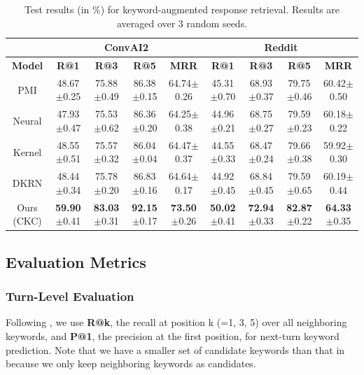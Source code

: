 \documentclass[letterpaper]{article} %
\begin{document}
\begin{table}[!t]
\small
\centering
\begin{tabular}{c|cccc|cccc}
\hline
&\multicolumn{4}{c|}{\textbf{ConvAI2}}&\multicolumn{4}{c}{\textbf{Reddit}}\\
\hline
\textbf{Model} & \textbf{R@1} & \textbf{R@3} & \textbf{R@5} & \textbf{MRR} & \textbf{R@1} & \textbf{R@3} & \textbf{R@5} & \textbf{MRR}\\
\hline
PMI & 48.67$\pm$0.25 & 75.88$\pm$0.49 & 86.38$\pm$0.15 & 64.74$\pm$0.26 & 45.31$\pm$0.70 & 68.93$\pm$0.37 & 79.75$\pm$0.46 & 60.42$\pm$0.50\\

Neural & 47.93$\pm$0.47 & 75.53$\pm$0.62 & 86.36$\pm$0.20 & 64.25$\pm$0.38 & 44.96$\pm$0.21 & 68.75$\pm$0.27 & 79.59$\pm$0.23 & 60.18$\pm$0.22\\

Kernel & 48.55$\pm$0.51 & 75.57$\pm$0.32 & 86.04$\pm$0.04 & 64.47$\pm$0.37 & 44.55$\pm$0.33 & 68.47$\pm$0.24 & 79.66$\pm$0.38 & 59.92$\pm$0.30\\

DKRN & 48.44$\pm$0.34 & 75.78$\pm$0.20 & 86.83$\pm$0.16 & 64.64$\pm$0.17 & 44.92$\pm$0.45 & 68.84$\pm$0.45 & 79.59$\pm$0.65 & 60.19$\pm$0.44\\
\hline

Ours (CKC) & \textbf{59.90}$\pm$0.41 & \textbf{83.03}$\pm$0.31 & \textbf{92.15}$\pm$0.17 & \textbf{73.50}$\pm$0.26 & \textbf{50.02}$\pm$0.41 & \textbf{72.94}$\pm$0.33 & \textbf{82.87}$\pm$0.22 & \textbf{64.33}$\pm$0.35\\
\hline
\end{tabular}
\caption{Test results (in \%) for keyword-augmented response retrieval. Results are averaged over 3 random seeds.}
\label{table: keyword-augmented response retrieval}
\end{table}
\subsection{Evaluation Metrics}
\label{sec: evaluation metrics}
\subsubsection{Turn-Level Evaluation} 
Following \cite{tang2019target, qin2020dynamic}, we use \textbf{R@k}, the recall at position k (=1, 3, 5) over all neighboring keywords, and \textbf{P@1}, the precision at the first position, for next-turn keyword prediction. Note that we have a smaller set of candidate keywords than that in \cite{tang2019target} because we only keep neighboring keywords as candidates. 
\end{document}
